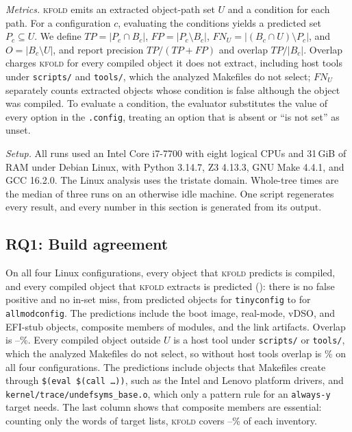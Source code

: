 \documentclass[acmsmall,screen,review]{acmart}
\newcommand{\tool}{\textsc{kfold}\xspace}
\begin{document}
\emph{Metrics.} \tool emits an extracted object-path set $U$ and a condition for each path. For a configuration $c$, evaluating the conditions yields a predicted set $P_c\subseteq U$. We define $TP=|P_c\cap B_c|$, $FP=|P_c\setminus B_c|$, $FN_U=|(B_c\cap U)\setminus P_c|$, and $O=|B_c\setminus U|$, and report precision $TP/(TP+FP)$ and overlap $TP/|B_c|$. Overlap charges \tool for every compiled object it does not extract, including host tools under \texttt{scripts/} and \texttt{tools/}, which the analyzed Makefiles do not select; $FN_U$ separately counts extracted objects whose condition is false although the object was compiled. To evaluate a condition, the evaluator substitutes the value of every option in the \texttt{.config}, treating an option that is absent or ``is not set'' as unset.

\emph{Setup.} All runs used an Intel Core i7-7700 with eight logical CPUs and 31\,GiB of RAM under Debian Linux, with Python 3.14.7, Z3 4.13.3, GNU Make 4.4.1, and GCC 16.2.0. The Linux analysis uses the tristate domain. Whole-tree times are the median of three runs on an otherwise idle machine. One script regenerates every result, and every number in this section is generated from its output.

\subsection{RQ1: Build agreement}
\label{sec:eval:agreement}
On all four Linux configurations, every object that \tool predicts is compiled, and every compiled object that \tool extracts is predicted (): there is no false positive and no in-set miss, from \NLinuxTinyconfigPred predicted objects for \texttt{tinyconfig} to \NLinuxAllmodconfigPred for \texttt{allmodconfig}. The predictions include the boot image, real-mode, vDSO, and EFI-stub objects, composite members of modules, and the link artifacts. Overlap is \NLinuxTinyconfigOverlap--\NLinuxAllmodconfigOverlap\%. Every compiled object outside $U$ is a host tool under \texttt{scripts/} or \texttt{tools/}, which the analyzed Makefiles do not select, so without host tools overlap is \NLinuxMinOverlapnohost\% on all four configurations. The predictions include objects that Makefiles create through \texttt{\$(eval \$(call \ldots))}, such as the Intel and Lenovo platform drivers, and \texttt{kernel/trace/undefsyms\_base.o}, which only a pattern rule for an \texttt{always-y} target needs. The last column shows that composite members are essential: counting only the words of target lists, \tool covers \NLinuxDebianTargetsoverlap--\NLinuxTinyconfigTargetsoverlap\% of each inventory.
\end{document}
